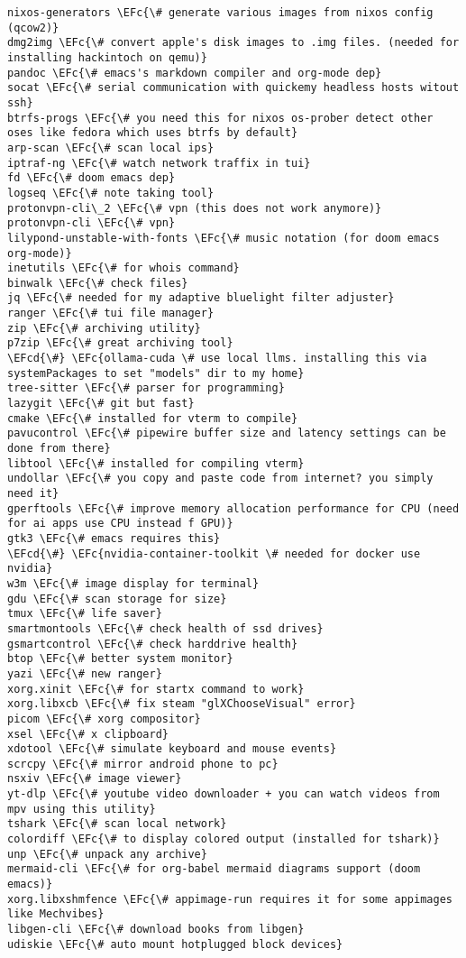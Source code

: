 \documentclass[14pt]{article}
\newcommand{\EFc}[1]{\textcolor{EFc}{#1}} %
\newcommand{\EFcd}[1]{\textcolor{EFcd}{#1}} %
\begin{document}
\begin{Code}
\begin{Verbatim}
nixos-generators \EFc{\# generate various images from nixos config (qcow2)}
dmg2img \EFc{\# convert apple's disk images to .img files. (needed for installing hackintoch on qemu)}
pandoc \EFc{\# emacs's markdown compiler and org-mode dep}
socat \EFc{\# serial communication with quickemy headless hosts witout ssh}
btrfs-progs \EFc{\# you need this for nixos os-prober detect other oses like fedora which uses btrfs by default}
arp-scan \EFc{\# scan local ips}
iptraf-ng \EFc{\# watch network traffix in tui}
fd \EFc{\# doom emacs dep}
logseq \EFc{\# note taking tool}
protonvpn-cli\_2 \EFc{\# vpn (this does not work anymore)}
protonvpn-cli \EFc{\# vpn}
lilypond-unstable-with-fonts \EFc{\# music notation (for doom emacs org-mode)}
inetutils \EFc{\# for whois command}
binwalk \EFc{\# check files}
jq \EFc{\# needed for my adaptive bluelight filter adjuster}
ranger \EFc{\# tui file manager}
zip \EFc{\# archiving utility}
p7zip \EFc{\# great archiving tool}
\EFcd{\#} \EFc{ollama-cuda \# use local llms. installing this via systemPackages to set "models" dir to my home}
tree-sitter \EFc{\# parser for programming}
lazygit \EFc{\# git but fast}
cmake \EFc{\# installed for vterm to compile}
pavucontrol \EFc{\# pipewire buffer size and latency settings can be done from there}
libtool \EFc{\# installed for compiling vterm}
undollar \EFc{\# you copy and paste code from internet? you simply need it}
gperftools \EFc{\# improve memory allocation performance for CPU (need for ai apps use CPU instead f GPU)}
gtk3 \EFc{\# emacs requires this}
\EFcd{\#} \EFc{nvidia-container-toolkit \# needed for docker use nvidia}
w3m \EFc{\# image display for terminal}
gdu \EFc{\# scan storage for size}
tmux \EFc{\# life saver}
smartmontools \EFc{\# check health of ssd drives}
gsmartcontrol \EFc{\# check harddrive health}
btop \EFc{\# better system monitor}
yazi \EFc{\# new ranger}
xorg.xinit \EFc{\# for startx command to work}
xorg.libxcb \EFc{\# fix steam "glXChooseVisual" error}
picom \EFc{\# xorg compositor}
xsel \EFc{\# x clipboard}
xdotool \EFc{\# simulate keyboard and mouse events}
scrcpy \EFc{\# mirror android phone to pc}
nsxiv \EFc{\# image viewer}
yt-dlp \EFc{\# youtube video downloader + you can watch videos from mpv using this utility}
tshark \EFc{\# scan local network}
colordiff \EFc{\# to display colored output (installed for tshark)}
unp \EFc{\# unpack any archive}
mermaid-cli \EFc{\# for org-babel mermaid diagrams support (doom emacs)}
xorg.libxshmfence \EFc{\# appimage-run requires it for some appimages like Mechvibes}
libgen-cli \EFc{\# download books from libgen}
udiskie \EFc{\# auto mount hotplugged block devices}

\end{Verbatim}
\end{Code}
\end{document}
